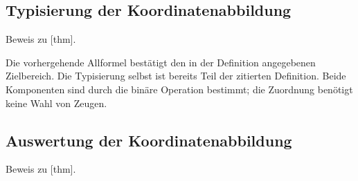\subsection{Typisierung der Koordinatenabbildung}
\hypertarget{coordinates.proof.SemigroupCoordinateMapFunction}{}
\noindent Beweis zu
[thm].
\begin{tabproofwide}
\end{tabproofwide}

Die vorhergehende Allformel bestätigt den in der Definition angegebenen
Zielbereich. Die Typisierung selbst ist bereits Teil der zitierten
Definition. Beide Komponenten sind durch die binäre Operation bestimmt;
die Zuordnung benötigt keine Wahl von Zeugen.
\subsection{Auswertung der Koordinatenabbildung}
\hypertarget{coordinates.proof.SemigroupCoordinateMapEvaluation}{}
\noindent Beweis zu
[thm].
\begin{tabproofwide}
\end{tabproofwide}

